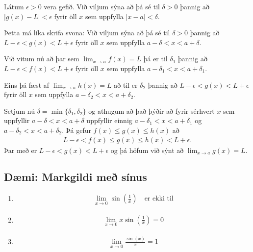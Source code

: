 \documentclass[a4paper,10pt,icelandic]{sphinxmanual}
\begin{document}

Látum \(\epsilon>0\) vera gefið. Við viljum sýna að þá sé til \(\delta>0\) þannig
að \(|g(x)-L|<\epsilon\) fyrir öll \(x\) sem uppfylla \(|x-a|<\delta\).

Þetta má líka skrifa svona:
Við viljum sýna að þá sé til \(\delta>0\) þannig
að \(L-\epsilon<g(x)<L+\epsilon\) fyrir öll \(x\) sem uppfylla \(a-\delta < x<a+\delta\).

Við vitum nú að þar sem \(\lim_{x\to a} f(x) = L\) þá er til \(\delta_1\)
þannig að \(L-\epsilon<f(x)<L+\epsilon\) fyrir öll \(x\) sem uppfylla \(a-\delta_1 < x<a+\delta_1\).

Eins þá fæst af \(\lim_{x\to a} h(x) = L\) að til er \(\delta_2\)
þannig að \(L-\epsilon<g(x)<L+\epsilon\) fyrir öll \(x\) sem uppfylla \(a-\delta_2 < x<a+\delta_2\).

Setjum nú \(\delta = \min\{\delta_1,\delta_2\}\) og athugum að það þýðir að fyrir sérhvert \(x\) sem
uppfyllir \(a-\delta < x < a+\delta\) uppfyllir einnig \(a-\delta_1 < x<a+\delta_1\)
og \(a-\delta_2 < x<a+\delta_2\). Þá gefur \(f(x)\leq g(x)\leq h(x)\) að
\begin{equation*}
\begin{split}L-\epsilon<f(x) \leq g(x) \leq h(x) < L+\epsilon.\end{split}
\end{equation*}
Þar með er \(L-\epsilon < g(x) < L+\epsilon\) og þá höfum við sýnt að
\(\lim_{x\to a} g(x) = L\).


\subsection{Dæmi: Markgildi með sínus}
\label{\detokenize{kafli02:daemi-markgildi-me-sinus}}\begin{enumerate}
\item {} \begin{equation*}
\begin{split}\lim_{x\to 0} \sin\left(\frac 1x\right) \quad \text{er ekki til}\end{split}
\end{equation*}
\item {} \begin{equation*}
\begin{split}\lim_{x\to 0} x\sin\left(\frac 1x\right) = 0\end{split}
\end{equation*}
\item {} \begin{equation*}
\begin{split}\lim_{x \to 0} \frac{\sin(x)}{x} = 1\end{split}
\end{equation*}
\end{enumerate}
\end{document}
